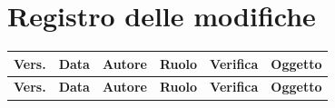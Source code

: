 \documentclass[a4paper,12pt]{article}
\begin{document}
    

    \section*{Registro delle modifiche} {
        \begin{longtable}{|p{1cm}|p{1.7cm}|p{3.5cm}|p{2.5cm}|p{2.5cm}|p{3.2cm}|}
            \hline
            \rowcolor{lightgray}
            \textbf{Vers.} & \textbf{Data} & \textbf{Autore} & \textbf{Ruolo} & \textbf{Verifica} & \textbf{Oggetto} \\
            \hline
            \endfirsthead
            
            \hline
            \rowcolor{lightgray}
            \textbf{Vers.} & \textbf{Data} & \textbf{Autore} & \textbf{Ruolo} & \textbf{Verifica} & \textbf{Oggetto} \\
            \hline
            \endhead


\end{longtable}}
\end{document}
